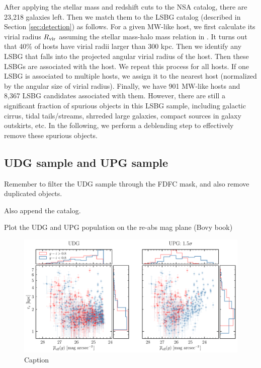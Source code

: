 \documentclass[twocolumn,astrosymb,twocolappendix]{aastex631}
\begin{document}
\begin{CJK*}{UTF8}{gbsn}
After applying the stellar mass and redshift cuts to the NSA catalog, there are 23,218 galaxies left. Then we match them to the LSBG catalog (described in Section \ref{sec:detection}) as follows. For a given MW-like host, we first calculate its virial radius $R_{\rm vir}$ assuming the stellar mass-halo mass relation in \citet{Behroozi2010}. It turns out that 40\% of hosts have virial radii larger than 300 kpc. Then we identify any LSBG that falls into the projected angular virial radius of the host. Then these LSBGs are associated with the host. We repeat this process for all hosts. If one LSBG is associated to multiple hosts, we assign it to the nearest host (normalized by the angular size of virial radius). Finally, we have 901 MW-like hosts and 8,367 LSBG candidates associated with them. However, there are still a significant fraction of spurious objects in this LSBG sample, including galactic cirrus, tidal tails/streams, shrreded large galaxies, compact sources in galaxy outskirts, etc. In the following, we perform a deblending step to effectively remove these spurious objects. 

\subsection{UDG sample and UPG sample}
Remember to filter the UDG sample through the FDFC mask, and also remove duplicated objects.

Also append the catalog.

Plot the UDG and UPG population on the re-abs mag plane (Bovy book)

\begin{figure}
	\vbox{ 
		\centering
		\includegraphics[width=1\linewidth]{udg_upg_sample.pdf}
	}
    \caption{Caption}
    \label{fig:udg_upg_re_mu}
\end{figure}



\end{CJK*}
\end{document}

